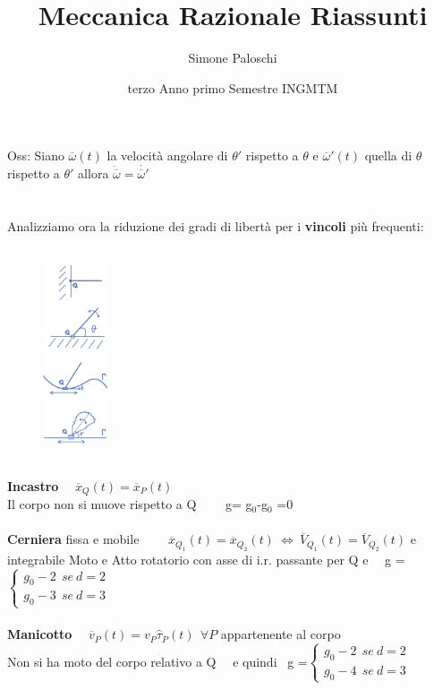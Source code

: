 \documentclass{article}
\title{Meccanica Razionale Riassunti}
\author{Simone Paloschi}
\date{terzo Anno primo Semestre INGMTM}
\begin{document}
%
%
Oss: Siano $\overline{\omega}(t)$ la velocità angolare di $\theta'$ rispetto a $\theta$ e $\overline{\omega}'(t)$ quella di $\theta$ rispetto a $\theta'$ allora $\dot{\overline{\omega}} = \dot{\overline{\omega}'}$ \\ \\ \\
%
%
Analizziamo ora la riduzione dei gradi di libertà per i \textbf{vincoli} più frequenti: \ \ \ \ \ \ \ \ \ \ \ \ \ \
%
\begin{figure}
\includegraphics[width=0.17\textwidth]{Vincoli.jpeg}
\end{figure} \\
%
%
\textbf{Incastro} \ \ $\overline{x}_Q(t)=\overline{x}_P(t)$\\
Il corpo non si muove rispetto a Q \ \ \ \ g= g$_0$-g$_0$ =0\\ \\
%
%
\textbf{Cerniera} fissa e mobile \ \ \ \ $\overline{x}_{Q_1}(t)=\overline{x}_{Q_2}(t) \ \Leftrightarrow \ \overline{V}_{Q_1}(t)=\overline{V}_{Q_2}(t)$ e integrabile \linebreak
Moto e Atto rotatorio con asse di i.r. passante per Q e \ \ g =$\begin{cases} g_0 -2 \ \ se \ d=2 \\ g_0 -3 \ \ se \ d=3 \end{cases}$\\ \\
%
%
\textbf{Manicotto} \ \ $\overline{v}_P(t) = v_P \hat{\tau}_P(t) \ \ \forall P$ appartenente al corpo \\
Non si ha moto del corpo relativo a Q \ \ e quindi \ g =$\begin{cases} g_0 -2 \ \ se \ d=2 \\ g_0 -4 \ \ se \ d=3  \end{cases}$\\ \\
\end{document}
